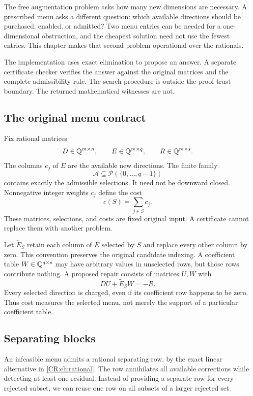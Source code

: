 The free augmentation problem asks how many new dimensions are necessary. A prescribed menu asks a different question: which available directions should be purchased, enabled, or admitted? Two menu entries can be needed for a one-dimensional obstruction, and the cheapest solution need not use the fewest entries. This chapter makes that second problem operational over the rationals.

The implementation uses exact elimination to propose an answer. A separate certificate checker verifies the answer against the original matrices and the complete admissibility rule. The search procedure is outside the proof trust boundary. The returned mathematical witnesses are not.

\subsection{The original menu contract}

Fix rational matrices
\[
 D\in\mathbb{Q}^{m\times n},\qquad E\in\mathbb{Q}^{m\times q},\qquad R\in\mathbb{Q}^{m\times s}.
\]
The columns $e_j$ of $E$ are the available new directions. The finite family
\[
 \mathcal A\subseteq\mathcal P(\{0,\ldots,q-1\})
\]
contains exactly the admissible selections. It need not be downward closed. Nonnegative integer weights $c_j$ define the cost
\[
 c(S)=\sum_{j\in S}c_j.
\]
These matrices, selections, and costs are fixed original input. A certificate cannot replace them with another problem.

Let $\widetilde E_S$ retain each column of $E$ selected by $S$ and replace every other column by zero. This convention preserves the original candidate indexing. A coefficient table $W\in\mathbb{Q}^{q\times s}$ may have arbitrary values in unselected rows, but those rows contribute nothing. A proposed repair consists of matrices $U,W$ with
\begin{equation}
 DU+\widetilde E_SW=-R.
 \label{CR:eq:menu-cover-primal}
\end{equation}
Every selected direction is charged, even if its coefficient row happens to be zero. Thus cost measures the selected menu, not merely the support of a particular coefficient table.

\subsection{Separating blocks}

An infeasible menu admits a rational separating row, by the exact linear alternative in \cref{CR:ch:rational}. The row annihilates all available corrections while detecting at least one residual. Instead of providing a separate row for every rejected subset, we can reuse one row on all subsets of a larger rejected set.

